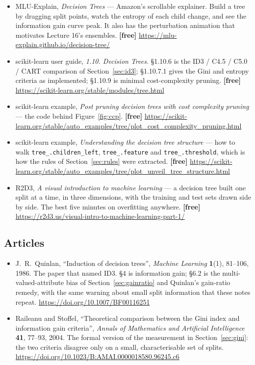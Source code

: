 \documentclass[11pt]{article}
\begin{document}
\begin{itemize}[leftmargin=*]
  \item MLU-Explain, \emph{Decision Trees} --- Amazon's scrollable explainer.
    Build a tree by dragging split points, watch the entropy of each child
    change, and see the information gain curve peak. It also has the
    perturbation animation that motivates Lecture 16's ensembles.
    \textbf{[free]} \url{https://mlu-explain.github.io/decision-tree/}
  \item scikit-learn user guide, \emph{1.10. Decision Trees}. \S1.10.6 is the
    ID3 / C4.5 / C5.0 / CART comparison of Section~\ref{sec:id3}; \S1.10.7.1
    gives the Gini and entropy criteria as implemented; \S1.10.9 is minimal
    cost-complexity pruning. \textbf{[free]}
    \url{https://scikit-learn.org/stable/modules/tree.html}
  \item scikit-learn example, \emph{Post pruning decision trees with cost
    complexity pruning} --- the code behind Figure~\ref{fig:ccp}.
    \textbf{[free]}
    \url{https://scikit-learn.org/stable/auto_examples/tree/plot_cost_complexity_pruning.html}
  \item scikit-learn example, \emph{Understanding the decision tree
    structure} --- how to walk \texttt{tree\_.children\_left},
    \texttt{tree\_.feature} and \texttt{tree\_.threshold}, which is how the
    rules of Section~\ref{sec:rules} were extracted. \textbf{[free]}
    \url{https://scikit-learn.org/stable/auto_examples/tree/plot_unveil_tree_structure.html}
  \item R2D3, \emph{A visual introduction to machine learning} --- a decision
    tree built one split at a time, in three dimensions, with the training and
    test sets drawn side by side. The best five minutes on overfitting
    anywhere. \textbf{[free]}
    \url{https://r2d3.us/visual-intro-to-machine-learning-part-1/}
\end{itemize}

\subsection*{Articles}

\begin{itemize}[leftmargin=*]
  \item J.\ R.\ Quinlan, ``Induction of decision trees'', \emph{Machine
    Learning} \textbf{1}(1), 81--106, 1986. The paper that named ID3. \S4
    is information gain; \S6.2 is the multi-valued-attribute bias of
    Section~\ref{sec:gainratio} and Quinlan's gain-ratio remedy, with the
    same warning about small split information that these notes repeat.
    \url{https://doi.org/10.1007/BF00116251}
  \item Raileanu and Stoffel, ``Theoretical comparison between the Gini index
    and information gain criteria'', \emph{Annals of Mathematics and
    Artificial Intelligence} \textbf{41}, 77--93, 2004. The formal version of
    the measurement in Section~\ref{sec:gini}: the two criteria disagree only
    on a small, characterisable set of splits.
    \url{https://doi.org/10.1023/B:AMAI.0000018580.96245.c6}
\end{itemize}

\enlargethispage{4\baselineskip}
\notesources{\AMLUnitVISources}
\end{document}
